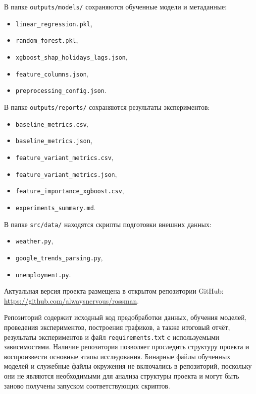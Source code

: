 \documentclass[12pt,a4paper]{article}
\numberwithin{equation}{section}
\begin{document}
В папке \texttt{outputs/models/} сохраняются обученные модели и метаданные:
\begin{itemize}
    \item \texttt{linear\_regression.pkl},
    \item \texttt{random\_forest.pkl},
    \item \texttt{xgboost\_shap\_holidays\_lags.json},
    \item \texttt{feature\_columns.json},
    \item \texttt{preprocessing\_config.json}.
\end{itemize}

В папке \texttt{outputs/reports/} сохраняются результаты экспериментов:
\begin{itemize}
    \item \texttt{baseline\_metrics.csv},
    \item \texttt{baseline\_metrics.json},
    \item \texttt{feature\_variant\_metrics.csv},
    \item \texttt{feature\_variant\_metrics.json},
    \item \texttt{feature\_importance\_xgboost.csv},
    \item \texttt{experiments\_summary.md}.
\end{itemize}

В папке \texttt{src/data/} находятся скрипты подготовки внешних данных:
\begin{itemize}
    \item \texttt{weather.py},
    \item \texttt{google\_trends\_parsing.py},
    \item \texttt{unemployment.py}.
\end{itemize}

Актуальная версия проекта размещена в открытом репозитории GitHub:
\url{https://github.com/alwaysnervous/rossman}.

Репозиторий содержит исходный код предобработки данных, обучения моделей,
проведения экспериментов, построения графиков, а также итоговый отчёт,
результаты экспериментов и файл \texttt{requirements.txt} с используемыми
зависимостями. Наличие репозитория позволяет проследить структуру проекта и
воспроизвести основные этапы исследования. Бинарные файлы обученных моделей и
служебные файлы окружения не включались в репозиторий, поскольку они не
являются необходимыми для анализа структуры проекта и могут быть заново
получены запуском соответствующих скриптов.
\end{document}
